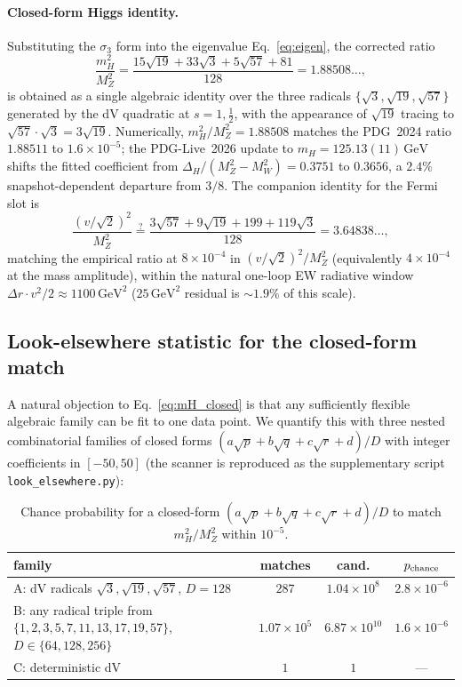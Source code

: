 \documentclass[twocolumn,aps,prd,floatfix,nofootinbib,superscriptaddress,10pt]{article}
\newcommand{\MW}{M_W}
\newcommand{\MZ}{M_Z}
\newcommand{\mH}{m_H}
\newcommand{\GeV}{\,\mathrm{GeV}}
\begin{document}
\paragraph{Closed-form Higgs identity.}  Substituting the $\sigma_3$ form into the eigenvalue Eq.~\eqref{eq:eigen}, the corrected ratio
\begin{equation}
\frac{\mH^2}{\MZ^2}
=\frac{15\sqrt{19}+33\sqrt{3}+5\sqrt{57}+81}{128}
=1.88508\ldots,
\label{eq:mH_closed}
\end{equation}
is obtained as a single algebraic identity over the three radicals $\{\sqrt{3},\sqrt{19},\sqrt{57}\}$ generated by the dV quadratic at $s=1,\tfrac12$, with the appearance of $\sqrt{19}$ tracing to $\sqrt{57}\cdot\sqrt{3}=3\sqrt{19}$.  Numerically, $\mH^2/\MZ^2=1.88508$ matches the PDG~2024 ratio $1.88511$ to $1.6\times 10^{-5}$; the PDG-Live~2026 update to $\mH=125.13(11)\GeV$ shifts the fitted coefficient from $\Delta_H/(\MZ^2-\MW^2)=0.3751$ to $0.3656$, a $2.4\%$ snapshot-dependent departure from $3/8$.  The companion identity for the Fermi slot is
\begin{equation}
\frac{(v/\sqrt 2)^2}{\MZ^2}\stackrel{?}{=}\frac{3\sqrt{57}+9\sqrt{19}+199+119\sqrt{3}}{128}=3.64838\ldots,
\end{equation}
matching the empirical ratio at $8\times 10^{-4}$ in $(v/\sqrt 2)^2/\MZ^2$ (equivalently $4\times 10^{-4}$ at the mass amplitude), within the natural one-loop EW radiative window $\Delta r\cdot v^2/2\approx 1100\GeV^2$ ($25\GeV^2$ residual is $\sim 1.9\%$ of this scale).

\subsection{Look-elsewhere statistic for the closed-form match}
\label{ssec:LEE}

A natural objection to Eq.~\eqref{eq:mH_closed} is that any sufficiently flexible algebraic family can be fit to one data point.  We quantify this with three nested combinatorial families of closed forms $(a\sqrt p+b\sqrt q+c\sqrt r+d)/D$ with integer coefficients in $[-50,50]$ (the scanner is reproduced as the supplementary script \texttt{look\_elsewhere.py}):

\begin{table}[h]
\centering
\caption{Chance probability for a closed-form $(a\sqrt p+b\sqrt q+c\sqrt r+d)/D$ to match $\mH^2/\MZ^2$ within $10^{-5}$.}
\label{tab:lee}
\begin{tabular}{p{}ccc}
\toprule
family & matches & cand. & $p_{\rm chance}$ \\
\midrule
A: dV radicals $\sqrt 3,\sqrt{19},\sqrt{57}$, $D=128$ & $287$ & $1.04{\times}10^8$ & $2.8{\times}10^{-6}$ \\
B: any radical triple from $\{1,2,3,5,7,11,13,17,19,57\}$, $D\in\{64,128,256\}$ & $1.07{\times}10^5$ & $6.87{\times}10^{10}$ & $1.6{\times}10^{-6}$ \\
C: deterministic dV & $1$ & $1$ & --- \\
\bottomrule
\end{tabular}
\end{table}
\end{document}
